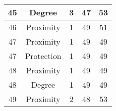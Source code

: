 \documentclass[results.tex]{subfiles}
\begin{document}
\begin{center}
\begin{tabular}{| c || c | c | c | c |}
    \hline
    45 & Degree & 3 & 47 & 53 \\ 
    \hline
    46 & Proximity & 1 & 49 & 51 \\ 
    \hline
    47 & Proximity & 1 & 49 & 49 \\ 
    \hline
    47 & Protection & 1 & 49 & 49 \\ 
    \hline
    48 & Proximity & 1 & 49 & 49 \\ 
    \hline
    48 & Degree & 1 & 49 & 49 \\ 
    \hline
    49 & Proximity & 2 & 48 & 53 \\ 
    \hline   \end{tabular}
\end{center}
\end{document}
